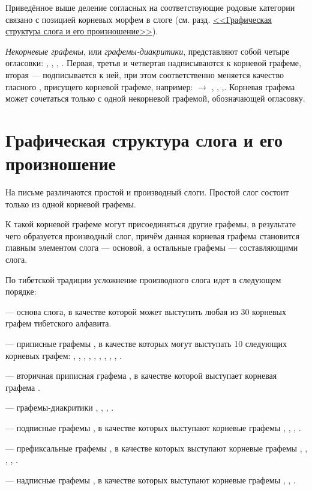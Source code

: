 Приведённое выше деление согласных на соответствующие родовые категории связано с позицией корневых морфем в слоге (см. разд. \hyperref[sec:gss]{<<Графическая структура слога и его произношение>>}).

\emph{Некорневые графемы}, или \emph{графемы-диакритики}, представляют собой четыре огласовки: , , , . Первая, третья и четвертая надписываются к корневой графеме, вторая --- подписывается к ней, при этом соответственно меняется качество гласного , присущего корневой графеме, например:  $\rightarrow$ , , ,. Корневая графема может сочетаться только с одной некорневой графемой, обозначающей огласовку.

\section{Графическая структура слога и его произношение}
\label{sec:gss}

На письме различаются простой и производный слоги. Простой слог состоит только из одной корневой графемы.

К такой корневой графеме могут присоединяться другие графемы, в результате чего образуется производный слог, причём данная корневая графема становится главным элементом слога --- основой, а остальные графемы --- составляющими слога.

По тибетской традиции усложнение производного слога идет в следующем порядке:
\begin{description}
	\item {} --- основа слога, в качестве которой может выступить любая из 30 корневых графем тибетского алфавита.
	\item {} --- приписные графемы , в качестве которых могут выступать 10 следующих корневых графем: , , , , , , , , , .
	\item {} --- вторичная приписная графема , в качестве которой выступает корневая графема .
	\item {} --- графемы-диакритики , , , .
	\item {} --- подписные графемы , в качестве которых выступают корневые графемы , , , .
	\item {} --- префиксальные графемы , в качестве которых выступают корневые графемы , , , , .
	\item {} --- надписные графемы , в качестве которых выступают корневые графемы , , .
\end{description}

